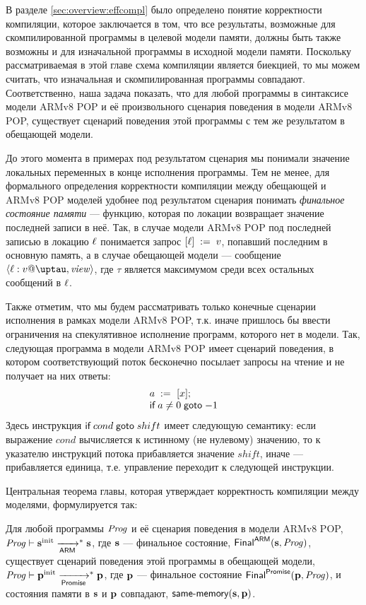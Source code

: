 В разделе \ref{sec:overview:effcompl} было определено понятие корректности компиляции,
которое заключается в том, что все результаты,
возможные для скомпилированной программы в целевой модели памяти,
должны быть также возможны и для изначальной программы в исходной модели памяти.
Поскольку рассматриваемая в этой главе схема компиляции является биекцией,
то мы можем считать, что изначальная и скомпилированная программы совпадают.
Соответственно, наша задача показать, что для любой программы в синтаксисе модели
ARMv8 POP и её произвольного сценария поведения в модели ARMv8 POP, существует
сценарий поведения этой программы с тем же результатом в обещающей модели.

До этого момента в примерах под результатом сценария мы понимали значение
локальных переменных в конце исполнения программы.
Тем не менее, для формального определения корректности компиляции между
обещающей и ARMv8 POP моделей удобнее под результатом сценария понимать 
\emph{финальное состояние памяти} --- функцию, которая по локации
возвращает значение последней записи в неё.
Так, в случае модели ARMv8 POP под последней записью в локацию $\ell$ понимается
запрос $[\ell]\;:=\;v$, попавший последним в основную память,
а в случае обещающей модели --- сообщение $\angled{\loc:\val@\tau,\R}$,
где $\tau$ является максимумом среди всех остальных сообщений в $\ell$.


Также отметим, что мы будем рассматривать только конечные сценарии исполнения
в рамках модели ARMv8 POP, т.к. иначе пришлось бы ввести ограничения на
спекулятивное исполнение программ, которого нет в модели.
Так, следующая программа в модели ARMv8 POP имеет сценарий поведения,
в котором соответствующий поток бесконечно посылает запросы на чтение и
не получает на них ответы:
\[\begin{array}{l}
a \;:=_{}\;[x]; \\
\textsf{if} \; a \not = 0 \; \textsf{goto} \; {-1}
\end{array}\]
Здесь инструкция $\textsf{if} \; cond \; \textsf{goto} \; shift$ имеет следующую семантику:
если выражение $cond$ вычисляется к истинному (не нулевому) значению,
то к указателю инструкций потока прибавляется значение $shift$,
иначе --- прибавляется единица, т.е. управление переходит к следующей инструкции.

Центральная теорема главы, которая утверждает корректность компиляции между
моделями, формулируется так:
\begin{theorem}
  Для любой программы $\mathit{Prog}$ и её сценария поведения в модели ARMv8 POP,
  $\mathit{Prog} \vdash \mathbf{s}^{\rm init} \xrightarrow[\mathsf{ARM}]{}^{*} \mathbf{s}$,
  где $\mathbf{s}$ --- финальное состояние, $\mathsf{Final}^{\mathsf{ARM}}(\mathbf{s}, \mathit{Prog})$,
  существует сценарий поведения этой программы в обещающей модели,
  $\mathit{Prog} \vdash \mathbf{p}^{\rm init} \xrightarrow[\mathsf{Promise}]{}^{*} \mathbf{p}$,
  где $\mathbf{p}$ --- финальное состояние $\mathsf{Final}^{\mathsf{Promise}}(\mathbf{p}, \mathit{Prog})$,
  и состояния памяти в $\mathbf{s}$ и $\mathbf{p}$ совпадают, $\textup{\sf same-memory}(\mathbf{s}, \mathbf{p})$.
\end{theorem}

